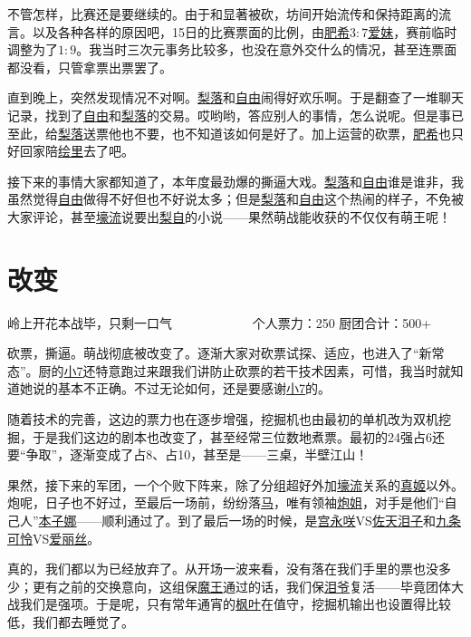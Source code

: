 不管怎样，比赛还是要继续的。由于和显著被砍，坊间开始流传和保持距离的流言。以及各种各样的原因吧，15日的比赛票面的比例，由\uline{肥希}$3:7$\uline{爱妹}，赛前临时调整为了$1:9$。我当时三次元事务比较多，也没在意外交什么的情况，甚至连票面都没看，只管拿票出票罢了。

直到晚上，突然发现情况不对啊。\uline{梨落}和\uline{自由}闹得好欢乐啊。于是翻查了一堆聊天记录，找到了\uline{自由}和\uline{梨落}的交易。哎哟哟，答应别人的事情，怎么说呢。但是事已至此，给\uline{梨落}送票他也不要，也不知道该如何是好了。加上运营的砍票，\uline{肥希}也只好回家陪\uline{绘里}去了吧。

接下来的事情大家都知道了，本年度最劲爆的撕逼大戏。\uline{梨落}和\uline{自由}谁是谁非，我虽然觉得\uline{自由}做得不好但也不好说太多；但是\uline{梨落}和\uline{自由}这个热闹的样子，不免被大家评论，甚至\uline{壕流}说要出\uline{梨}\uline{自}的小说——果然萌战能收获的不仅仅有萌王呢！

\chapter{改变}
\begin{center}
{\subTitle 岭上开花本战毕，只剩一口气}
\subMemo
　　　　　　个人票力：250 厨团合计：500+
\end{center}

砍票，撕逼。萌战彻底被改变了。逐渐大家对砍票试探、适应，也进入了“新常态”。厨的\uline{小7}还特意跑过来跟我们讲防止砍票的若干技术因素，可惜，我当时就知道她说的基本不正确。不过无论如何，还是要感谢\uline{小7}的。

随着技术的完善，这边的票力也在逐步增强，挖掘机也由最初的单机改为双机挖掘，于是我们这边的剧本也改变了，甚至经常三位数地煮票。最初的24强占6还要“争取”，逐渐变成了占8、占10，甚至是——三桌，半壁江山！

果然，接下来的军团，一个个败下阵来，除了分组超好外加\uline{壕流}关系的\uline{真姬}以外。炮呢，日子也不好过，至最后一场前，纷纷落\uline{马}，唯有领袖\uline{炮姐}，对手是他们“自己人”\uline{本子娜}——顺利通过了。到了最后一场的时候，是\uline{宫永咲}VS\uline{佐天泪子}和\uline{九条可怜}VS\uline{爱丽丝}。

真的，我们都以为已经放弃了。从开场一波来看，没有落在我们手里的票也没多少；更有之前的交换意向，这组保\uline{魔王}通过的话，我们保\uline{泪爷}复活——毕竟团体大战我们是强项。于是呢，只有常年通宵的\uline{枫叶}在值守，挖掘机输出也设置得比较低，我们都去睡觉了。

